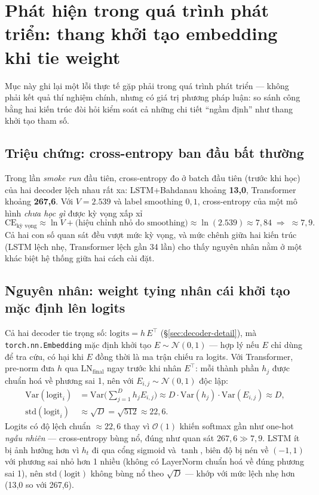 \section{Phát hiện trong quá trình phát triển: thang khởi tạo embedding khi tie weight}
\label{sec:embedding-init}

Mục này ghi lại một lỗi thực tế gặp phải trong quá trình phát triển --- không
phải kết quả thí nghiệm chính, nhưng có giá trị phương pháp luận: so sánh công
bằng hai kiến trúc đòi hỏi kiểm soát cả những chi tiết ``ngầm định'' như thang
khởi tạo tham số.

\subsection{Triệu chứng: cross-entropy ban đầu bất thường}

Trong lần \emph{smoke run} đầu tiên, cross-entropy đo ở batch đầu tiên (trước
khi học) của hai decoder lệch nhau rất xa: LSTM+Bahdanau khoảng \textbf{13,0},
Transformer khoảng \textbf{267,6}. Với $V = 2.539$ và label smoothing $0{,}1$,
cross-entropy của một mô hình \emph{chưa học gì} được kỳ vọng xấp xỉ
\begin{equation}
	\text{CE}_{\text{kỳ vọng}} \approx \ln V + \text{(hiệu chỉnh nhỏ do
	smoothing)} \approx \ln(2.539) \approx 7{,}84 \;\Rightarrow\; \approx 7{,}9.
\end{equation}
Cả hai con số quan sát đều vượt mức kỳ vọng, và mức chênh giữa hai kiến trúc
(LSTM lệch nhẹ, Transformer lệch gần 34 lần) cho thấy nguyên nhân nằm ở một
khác biệt hệ thống giữa hai cách cài đặt.

\subsection{Nguyên nhân: weight tying nhân cái khởi tạo mặc định lên logits}

Cả hai decoder tie trọng số: $\text{logits} = h\,E^\top$
(\S\ref{sec:decoder-detail}), mà \texttt{torch.nn.Embedding} mặc định khởi tạo
$E \sim \mathcal{N}(0,1)$ --- hợp lý nếu $E$ chỉ dùng để tra cứu, có hại khi
$E$ đồng thời là ma trận chiếu ra logits. Với Transformer, pre-norm đưa $h$
qua $\text{LN}_{\text{final}}$ ngay trước khi nhân $E^\top$: mỗi thành phần
$h_j$ được chuẩn hoá về phương sai 1, nên với $E_{i,j} \sim \mathcal{N}(0,1)$
độc lập:
\begin{align}
	\text{Var}(\text{logit}_i) &= \text{Var}\Big(\sum_{j=1}^{D} h_j E_{i,j}\Big)
	\approx D \cdot \text{Var}(h_j)\cdot\text{Var}(E_{i,j}) \approx D, \\
	\text{std}(\text{logit}_i) &\approx \sqrt{D} = \sqrt{512} \approx 22{,}6.
\end{align}
Logits có độ lệch chuẩn $\approx 22,6$ thay vì $\mathcal{O}(1)$ khiến softmax
gần như one-hot \emph{ngẫu nhiên} --- cross-entropy bùng nổ, đúng như quan sát
$267,6 \gg 7,9$. LSTM ít bị ảnh hưởng hơn vì $h_t$ đi qua cổng sigmoid và
$\tanh$, biên độ bị nén về $(-1,1)$ với phương sai nhỏ hơn 1 nhiều (không có
LayerNorm chuẩn hoá về đúng phương sai 1), nên $\text{std}(\text{logit})$
không bùng nổ theo $\sqrt{D}$ --- khớp với mức lệch nhẹ hơn (13,0 so với 267,6).

